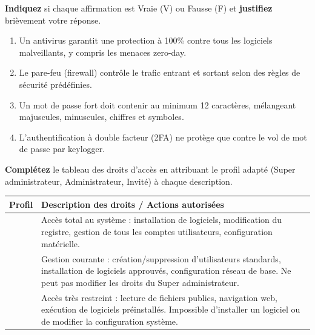 \documentclass[11pt]{article}
\begin{document}
\begin{exercice}
\textbf{Indiquez} si chaque affirmation est Vraie (V) ou Fausse (F) et \textbf{justifiez} brièvement votre réponse.

\begin{enumerate}
    \item Un antivirus garantit une protection à 100\% contre tous les logiciels malveillants, y compris les menaces zero-day.
    \item Le pare-feu (firewall) contrôle le trafic entrant et sortant selon des règles de sécurité prédéfinies.
    \item Un mot de passe fort doit contenir au minimum 12 caractères, mélangeant majuscules, minuscules, chiffres et symboles.
    \item L'authentification à double facteur (2FA) ne protège que contre le vol de mot de passe par keylogger.
\end{enumerate}
\end{exercice}

\begin{exercice}
\textbf{Complétez} le tableau des droits d'accès en attribuant le profil adapté (Super administrateur, Administrateur, Invité) à chaque description.

\begin{tabular}{|p{4cm}|p{11.5cm}|}
\hline
\textbf{Profil} & \textbf{Description des droits / Actions autorisées} \\ \hline
\dotfill & Accès total au système : installation de logiciels, modification du registre, gestion de tous les comptes utilisateurs, configuration matérielle. \\ \hline
\dotfill & Gestion courante : création/suppression d'utilisateurs standards, installation de logiciels approuvés, configuration réseau de base. Ne peut pas modifier les droits du Super administrateur. \\ \hline
\dotfill & Accès très restreint : lecture de fichiers publics, navigation web, exécution de logiciels préinstallés. Impossible d'installer un logiciel ou de modifier la configuration système. \\ \hline
\end{tabular}
\end{exercice}
\end{document}
